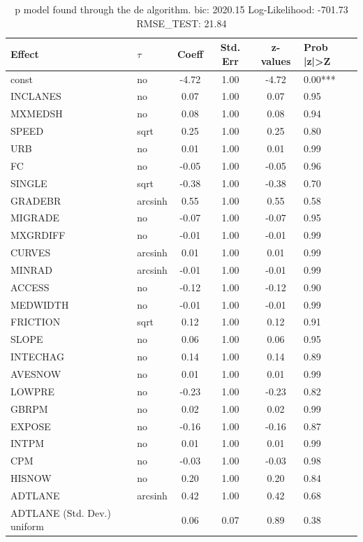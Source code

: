 \begin{table}
	\caption{p model found through the de algorithm. bic: 2020.15 Log-Likelihood: -701.73 RMSE_TEST: 21.84}
	\begin{center}
		\begin{tabular}{|l|l|c|c|c|l|}
			\hline
			Effect & $\tau$ & Coeff & Std. Err & z-values & Prob |z|>Z \\
			\hline
			const & no & -4.72 & 1.00 & -4.72 & 0.00*** \\
			\hline
			INCLANES & no & 0.07 & 1.00 & 0.07 & 0.95 \\
			\hline
			MXMEDSH & no & 0.08 & 1.00 & 0.08 & 0.94 \\
			\hline
			SPEED & sqrt & 0.25 & 1.00 & 0.25 & 0.80 \\
			\hline
			URB & no & 0.01 & 1.00 & 0.01 & 0.99 \\
			\hline
			FC & no & -0.05 & 1.00 & -0.05 & 0.96 \\
			\hline
			SINGLE & sqrt & -0.38 & 1.00 & -0.38 & 0.70 \\
			\hline
			GRADEBR & arcsinh & 0.55 & 1.00 & 0.55 & 0.58 \\
			\hline
			MIGRADE & no & -0.07 & 1.00 & -0.07 & 0.95 \\
			\hline
			MXGRDIFF & no & -0.01 & 1.00 & -0.01 & 0.99 \\
			\hline
			CURVES & arcsinh & 0.01 & 1.00 & 0.01 & 0.99 \\
			\hline
			MINRAD & arcsinh & -0.01 & 1.00 & -0.01 & 0.99 \\
			\hline
			ACCESS & no & -0.12 & 1.00 & -0.12 & 0.90 \\
			\hline
			MEDWIDTH & no & -0.01 & 1.00 & -0.01 & 0.99 \\
			\hline
			FRICTION & sqrt & 0.12 & 1.00 & 0.12 & 0.91 \\
			\hline
			SLOPE & no & 0.06 & 1.00 & 0.06 & 0.95 \\
			\hline
			INTECHAG & no & 0.14 & 1.00 & 0.14 & 0.89 \\
			\hline
			AVESNOW & no & 0.01 & 1.00 & 0.01 & 0.99 \\
			\hline
			LOWPRE & no & -0.23 & 1.00 & -0.23 & 0.82 \\
			\hline
			GBRPM & no & 0.02 & 1.00 & 0.02 & 0.99 \\
			\hline
			EXPOSE & no & -0.16 & 1.00 & -0.16 & 0.87 \\
			\hline
			INTPM & no & 0.01 & 1.00 & 0.01 & 0.99 \\
			\hline
			CPM & no & -0.03 & 1.00 & -0.03 & 0.98 \\
			\hline
			HISNOW & no & 0.20 & 1.00 & 0.20 & 0.84 \\
			\hline
			ADTLANE & arcsinh & 0.42 & 1.00 & 0.42 & 0.68 \\
			\hline
			ADTLANE (Std. Dev.) uniform &  & 0.06 & 0.07 & 0.89 & 0.38 \\
			\hline
		\end{tabular}
	\end{center}
\end{table}